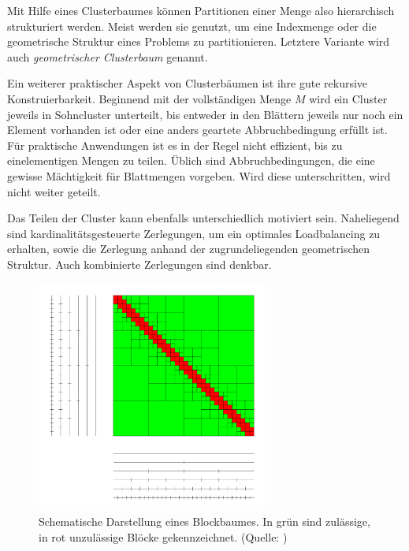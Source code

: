       Mit Hilfe eines Clusterbaumes können Partitionen einer Menge also hierarchisch strukturiert werden. Meist werden sie genutzt, um eine Indexmenge oder
      die geometrische Struktur eines Problems zu partitionieren. Letztere Variante wird auch \textit{geometrischer Clusterbaum} genannt. 
      
      Ein weiterer praktischer Aspekt
      von Clusterbäumen ist ihre gute rekursive Konstruierbarkeit. Beginnend mit der vollständigen Menge $M$ wird ein Cluster jeweils in Sohncluster unterteilt,
      bis entweder in den Blättern jeweils nur noch ein Element vorhanden ist oder eine anders geartete Abbruchbedingung erfüllt ist. Für praktische Anwendungen ist
      es in der Regel nicht effizient, bis zu einelementigen Mengen zu teilen. Üblich sind Abbruchbedingungen, die eine gewisse Mächtigkeit für Blattmengen vorgeben.
      Wird diese unterschritten, wird nicht weiter geteilt. 
      
      Das Teilen der Cluster kann ebenfalls unterschiedlich motiviert sein. Naheliegend sind kardinalitätsgesteuerte Zerlegungen, um ein optimales Loadbalancing zu erhalten,
      sowie die Zerlegung anhand der zugrundeliegenden geometrischen Struktur. Auch kombinierte Zerlegungen sind denkbar.
      
      \begin{figure}[b]
	\includegraphics[width=0.68\textwidth]{img/blockbaum.png}
	\caption{Schematische Darstellung eines Blockbaumes. In grün sind zulässige, in rot unzulässige Blöcke gekennzeichnet. (Quelle: \citet{h2-slides})}
	\label{fig:blockbaum}
      \end{figure}
      
